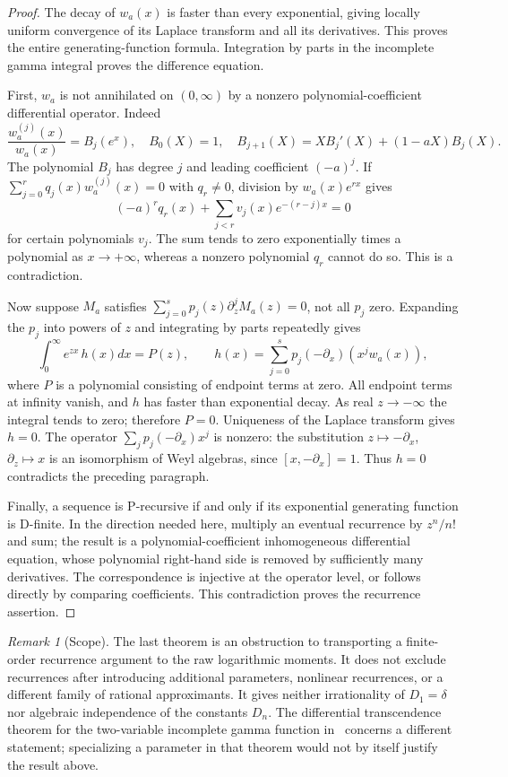 \documentclass[11pt,a4paper]{article}
\theoremstyle{definition}
\theoremstyle{remark}
\newtheorem{remark}[theorem]{Remark}
\numberwithin{equation}{section}
\begin{document}
\begin{proof}
The decay of $w_a(x)$ is faster than every exponential, giving
locally uniform convergence of its Laplace transform and all its
derivatives. This proves the entire generating-function formula.
Integration by parts in the incomplete gamma integral proves the
difference equation.

First, $w_a$ is not annihilated on $(0,\infty)$ by a nonzero
polynomial-coefficient differential operator. Indeed
\[
 \frac{w_a^{(j)}(x)}{w_a(x)}=B_j(e^x),
 \quad B_0(X)=1,\quad
 B_{j+1}(X)=XB_j'(X)+(1-aX)B_j(X).
\]
The polynomial $B_j$ has degree $j$ and leading coefficient
$(-a)^j$. If $\sum_{j=0}^rq_j(x)w_a^{(j)}(x)=0$ with
$q_r\ne0$, division by $w_a(x)e^{rx}$ gives
\[
 (-a)^rq_r(x)+\sum_{j<r}v_j(x)e^{-(r-j)x}=0
\]
for certain polynomials $v_j$. The sum tends to zero exponentially
times a polynomial as $x\to+\infty$, whereas a nonzero polynomial
$q_r$ cannot do so. This is a contradiction.

Now suppose $M_a$ satisfies
$\sum_{j=0}^s p_j(z)\partial_z^jM_a(z)=0$, not all $p_j$ zero.
Expanding the $p_j$ into powers of $z$ and integrating by parts
repeatedly gives
\[
 \int_0^\infty e^{zx}\,h(x)dx=P(z),\qquad
 h(x)=\sum_{j=0}^s p_j(-\partial_x)(x^jw_a(x)),
\]
where $P$ is a polynomial consisting of endpoint terms at zero.
All endpoint terms at infinity vanish, and $h$ has faster than
exponential decay. As real $z\to-\infty$ the integral tends to zero;
therefore $P=0$. Uniqueness of the Laplace transform gives $h=0$.
The operator
$\sum_j p_j(-\partial_x)x^j$ is nonzero: the substitution
$z\mapsto-\partial_x$, $\partial_z\mapsto x$ is an isomorphism of
Weyl algebras, since $[x,-\partial_x]=1$.
Thus $h=0$ contradicts the preceding paragraph.

Finally, a sequence is P-recursive if and only if its exponential
generating function is D-finite. In the direction needed here,
multiply an eventual recurrence by $z^n/n!$ and sum; the result
is a polynomial-coefficient inhomogeneous differential equation,
whose polynomial right-hand side is removed by sufficiently many
derivatives. The correspondence is injective at the operator level,
or follows directly by comparing coefficients. This contradiction
proves the recurrence assertion.
\end{proof}

\begin{remark}[Scope]
The last theorem is an obstruction to transporting a finite-order
recurrence argument to the raw logarithmic moments. It does not
exclude recurrences after introducing additional parameters, nonlinear
recurrences, or a different family of rational approximants. It gives
neither irrationality of $D_1=\delta$ nor algebraic independence of
the constants $D_n$. The differential transcendence theorem for the
two-variable incomplete gamma function in~\cite{p3:Arreche2013} concerns
a different statement; specializing a parameter in that theorem
would not by itself justify the result above.
\end{remark}
\end{document}
